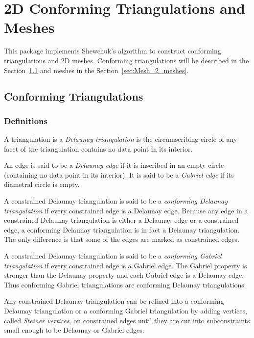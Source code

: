 \chapter{2D Conforming Triangulations and Meshes}
\label{user_chapter_2D_Meshes}


\minitoc

This package implements Shewchuk's algorithm to construct conforming
triangulations and 2D meshes.  Conforming triangulations will be
described in the Section~\ref{sec:Mesh_2_conforming_triangulation} and
meshes in the Section~\ref{sec:Mesh_2_meshes}.

\section{Conforming Triangulations}
\label{sec:Mesh_2_conforming_triangulation}

\subsection{Definitions}
\label{sec:Mesh_2_conforming_definitions}

A triangulation is a \emph{Delaunay triangulation} is the circumscribing
circle of any facet of the triangulation contains no data point in its
interior.

An edge is said to be a \emph{Delaunay edge} if it is inscribed in an empty
circle (containing no data point in its interior). It is said to be a
\emph{Gabriel edge} if its diametral circle is empty.

A constrained Delaunay triangulation is said to be a \emph{conforming
  Delaunay triangulation} if every constrained edge is a Delaunay edge.
Because any edge in a constrained Delaunay triangulation is either a
Delaunay edge or a constrained edge, a conforming Delaunay triangulation is
in fact a Delaunay triangulation. The only difference is that some of the
edges are marked as constrained edges.

A constrained Delaunay triangulation is said to be a \emph{conforming
  Gabriel triangulation} if every constrained edge is a Gabriel edge. The
Gabriel property is stronger than the Delaunay property and each Gabriel
edge is a Delaunay edge. Thus conforming Gabriel triangulations are
conforming Delaunay triangulations.

Any constrained Delaunay triangulation can be refined into a
conforming Delaunay triangulation or a conforming Gabriel
triangulation by adding vertices, called \emph{Steiner vertices}, on
constrained edges until they are cut into subconstraints small enough
to be Delaunay or Gabriel edges.

